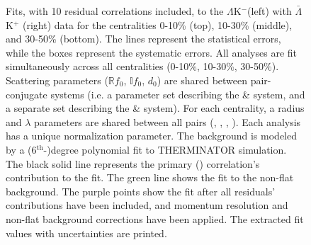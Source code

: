 \documentclass[../AnalysisNoteJBuxton.tex]{subfiles}
\renewcommand{\ResNum}{_10Res}
\renewcommand{\SaveNameModLamKch}{\MomRes\NonFlatBgd\ResNum\PrimMaxDecay\ResMethod\ParamFixAndShareLamKch}
\begin{document}
\begin{landscape}
\begin{figure}[h!]
  \centering
  \caption[$\Lambda$K$^{-}$($\bar{\Lambda}$K$^{+}$) Fits with 10 Residuals]{Fits, with 10 residual correlations included, to the $\Lambda$K$^{-}$(left) with $\bar{\Lambda}$K$^{+}$ (right) data for the centralities 0-10\% (top), 10-30\% (middle), and 30-50\% (bottom).
 The lines represent the statistical errors, while the boxes represent the systematic errors.  
 All \LamKpm analyses are fit simultaneously across all centralities (0-10\%, 10-30\%, 30-50\%).
 Scattering parameters ($\mathbb{R}f_{0}$, $\mathbb{I}f_{0}$, $d_{0}$) are shared between pair-conjugate systems (i.e. a parameter set describing the \LamKchP \& \ALamKchM system, and a separate set describing the \LamKchM \& \ALamKchP system).
 For each centrality, a radius and $\lambda$ parameters are shared between all pairs (\LamKchP, \ALamKchM, \LamKchM, \ALamKchP).
 Each analysis has a unique normalization parameter.
 The background is modeled by a (6$^{\mathrm{th}}$-)degree polynomial fit to THERMINATOR simulation.
 The black solid line represents the primary (\LamK) correlation's contribution to the fit.  
 The green line shows the fit to the non-flat background.
 The purple points show the fit after all residuals' contributions have been included, and momentum resolution and non-flat background corrections have been applied.
 The extracted fit values with uncertainties are printed.}
  \label{fig:LamKchMwConjFits_10Res}
\end{figure}




\end{landscape}
\end{document}
